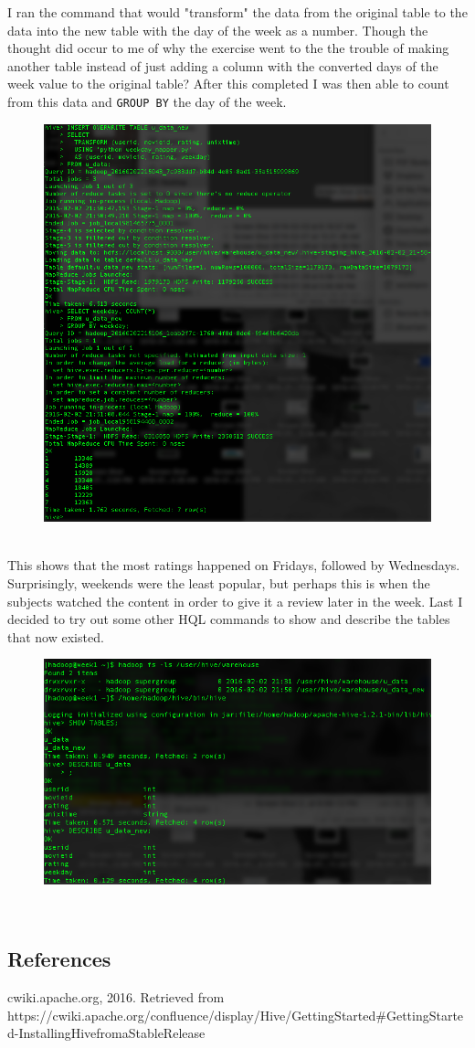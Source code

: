 \documentclass[10pt]{article}
\begin{document}
\indent I ran the command that would "transform" the data from the original table to the data into the new table with the day of the week as a number. Though the thought did occur to me of why the exercise went to the the trouble of making another table instead of just adding a column with the converted days of the week value to the original table? After this completed I was then able to count from this data and \verb|GROUP BY| the day of the week.
\begin{figure}[!h]
\includegraphics[scale=0.37]{final.png}
\centering
\end{figure}\\
\indent This shows that the most ratings happened on Fridays, followed by Wednesdays. Surprisingly, weekends were the least popular, but perhaps this is when the subjects watched the content in order to give it a review later in the week. Last I decided to try out some other HQL commands to show and describe the tables that now existed.
\pagebreak
\begin{figure}[!h]
\includegraphics[scale=0.37]{explore01.png}
\centering
\end{figure}\\
\subsection*{References}
cwiki.apache.org, 2016. Retrieved from\\ https://cwiki.apache.org/confluence/display/Hive/GettingStarted\#GettingStarted-InstallingHivefromaStableRelease
\end{document}
